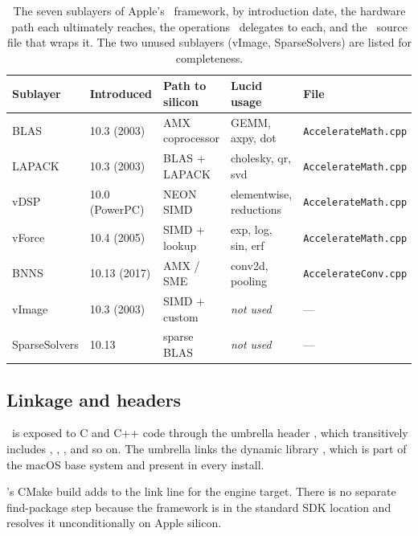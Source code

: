 \begin{table}[t]
\centering
\small
\begin{tabular}{lllll}
\toprule
Sublayer & Introduced & Path to silicon & Lucid usage & File \\
\midrule
BLAS    & 10.3 (2003)  & AMX coprocessor   & GEMM, axpy, dot     & \texttt{AccelerateMath.cpp} \\
LAPACK  & 10.3 (2003)  & BLAS + LAPACK     & cholesky, qr, svd   & \texttt{AccelerateMath.cpp} \\
vDSP    & 10.0 (PowerPC) & NEON SIMD       & elementwise, reductions & \texttt{AccelerateMath.cpp} \\
vForce  & 10.4 (2005)  & SIMD + lookup     & exp, log, sin, erf  & \texttt{AccelerateMath.cpp} \\
BNNS    & 10.13 (2017) & AMX / SME         & conv2d, pooling     & \texttt{AccelerateConv.cpp} \\
vImage  & 10.3 (2003)  & SIMD + custom     & \emph{not used}     & --- \\
SparseSolvers & 10.13  & sparse BLAS       & \emph{not used}     & --- \\
\bottomrule
\end{tabular}
\caption[Accelerate sublayers and \Lucid\ usage.]{The seven
sublayers of Apple's \Accelerate\ framework, by introduction date,
the hardware path each ultimately reaches, the operations \Lucid\
delegates to each, and the \Lucid\ source file that wraps it. The
two unused sublayers (vImage, SparseSolvers) are listed for
completeness.}
\label{tab:accelerate:sublayers}
\end{table}

\subsection{Linkage and headers}
\label{ssec:accelerate:linkage}

\Accelerate\ is exposed to C and C++ code through the umbrella header
\code{<Accelerate/Accelerate.h>}, which transitively includes
, ,
, and so on. The umbrella links the
dynamic library , which is part of the
macOS base system and present in every install.

\Lucid's CMake build adds  to the link
line for the engine target. There is no separate find-package step
because the framework is in the standard SDK location and
 resolves it
unconditionally on Apple silicon.

